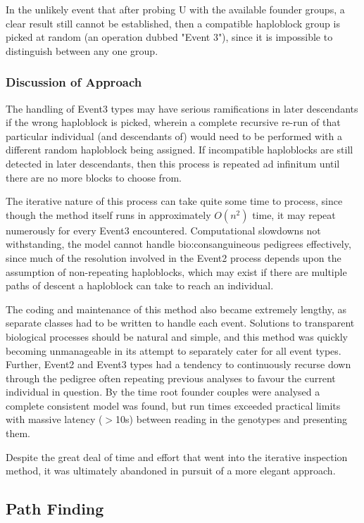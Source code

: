 In the unlikely event that after probing U with the available founder groups, a clear result still cannot be established, then a compatible haploblock group is picked at random (an operation dubbed "Event 3"), since it is impossible to distinguish between any one group.


\subsubsection{Discussion of Approach}\label{ref:haplo:eventdiscuss}
The handling of Event3 types may have serious ramifications in later descendants if the wrong haploblock is picked, wherein a complete recursive re-run of that particular individual (and descendants of) would need to be performed with a different random haploblock being assigned. If incompatible haploblocks are still detected in later descendants, then this process is repeated ad infinitum until there are no more blocks to choose from. 

The iterative nature of this process can take quite some time to process, since though the method itself runs in approximately $O(n^2)$ time, it may repeat numerously for every Event3 encountered. Computational slowdowns not withstanding, the model cannot handle \gls{bio:consanguineous} pedigrees effectively, since much of the resolution involved in the Event2 process depends upon the assumption of non-repeating haploblocks, which may exist if there are multiple paths of descent a haploblock can take to reach an individual.

The coding and maintenance of this method also became extremely lengthy, as separate classes had to be written to handle each event. Solutions to transparent biological processes should be natural and simple, and this method was quickly becoming unmanageable in its attempt to separately cater for all event types. Further, Event2 and Event3 types had a tendency to continuously recurse down through the pedigree often repeating previous analyses to favour the current individual in question. By the time root founder couples were analysed a complete consistent model was found, but run times exceeded practical limits with massive latency ($>$10s) between reading in the genotypes and presenting them.

Despite the great deal of time and effort that went into the iterative inspection method, it was ultimately abandoned in pursuit of a more elegant approach.

\subsection{Path Finding}

